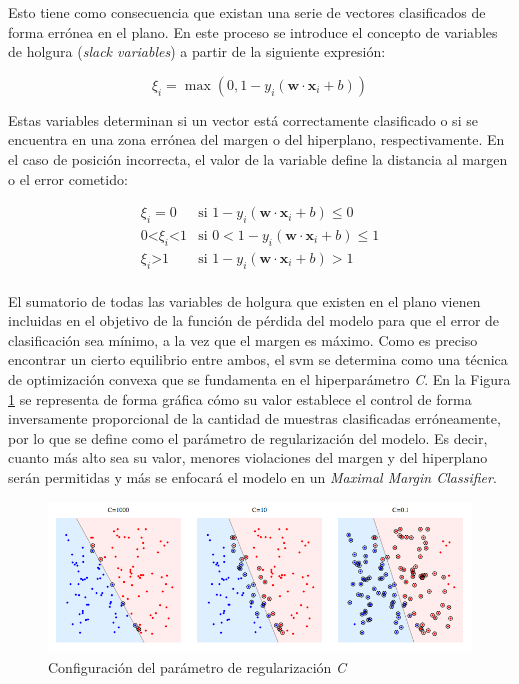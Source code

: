 Esto tiene como consecuencia que existan una serie de vectores clasificados de forma errónea en el plano. En este proceso se introduce el concepto de variables de holgura (\textit{slack variables}) a partir de la siguiente expresión:

\[ \xi_i = \max(0, 1 - y_i (\mathbf{w} \cdot \mathbf{x}_i + b))\]

Estas variables determinan si un vector está correctamente clasificado o si se encuentra en una zona errónea del margen o del hiperplano, respectivamente. En el caso de posición incorrecta, el valor de la variable define la distancia al margen o el error cometido:

\[\begin{array}{ll}
    \xi_i = 0 & \text{si } 1 - y_i (\mathbf{w} \cdot \mathbf{x}_i + b) \leq 0 \\
    0 \text{<} \xi_i \text{<} 1 & \text{si } 0 < 1 - y_i (\mathbf{w} \cdot \mathbf{x}_i + b) \leq 1 \\
    \xi_i \text{>} 1 & \text{si } 1 - y_i (\mathbf{w} \cdot \mathbf{x}_i + b) > 1 \\
\end{array}\]

\vspace{3mm}

El sumatorio de todas las variables de holgura que existen en el plano vienen incluidas en el objetivo de la función de pérdida del modelo para que el error de clasificación sea mínimo, a la vez que el margen es máximo. Como es preciso encontrar un cierto equilibrio entre ambos, el \gls{svm} se determina como una técnica de optimización convexa que se fundamenta en el hiperparámetro \textit{C}. En la Figura \ref{fig:parametroc} se representa de forma gráfica cómo su valor establece el control de forma inversamente proporcional de la cantidad de muestras clasificadas erróneamente, por lo que se define como el parámetro de regularización del modelo. Es decir, cuanto más alto sea su valor, menores violaciones del margen y del hiperplano serán permitidas y más se enfocará el modelo en un \textit{Maximal Margin Classifier}.~\cite{svmciencia}

\vspace{3mm}

\begin{figure}[h!]
    \centering
    \includegraphics[width=1\textwidth]{img/teoria/parametroc.png}
    \caption{Configuración del parámetro de regularización \textit{C} \cite{velocity}}
    \label{fig:parametroc}
\end{figure}


